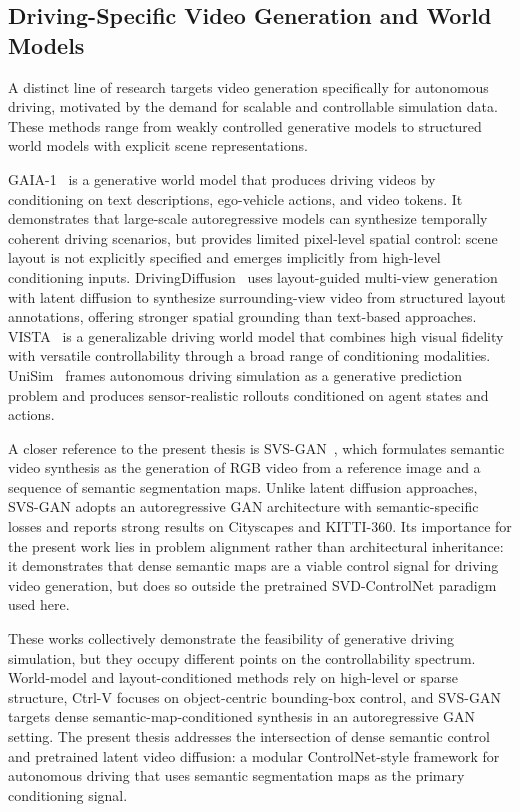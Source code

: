 \FloatBarrier

\subsection{Driving-Specific Video Generation and World Models}
\label{subsec:driving_generation}

A distinct line of research targets video generation specifically for autonomous driving, motivated by the demand for scalable and controllable simulation data. These methods range from weakly controlled generative models to structured world models with explicit scene representations.

GAIA-1~\cite{hu2023gaia} is a generative world model that produces driving videos by conditioning on text descriptions, ego-vehicle actions, and video tokens. It demonstrates that large-scale autoregressive models can synthesize temporally coherent driving scenarios, but provides limited pixel-level spatial control: scene layout is not explicitly specified and emerges implicitly from high-level conditioning inputs. DrivingDiffusion~\cite{li2023drivingdiffusion} uses layout-guided multi-view generation with latent diffusion to synthesize surrounding-view video from structured layout annotations, offering stronger spatial grounding than text-based approaches. VISTA~\cite{gao2024vista} is a generalizable driving world model that combines high visual fidelity with versatile controllability through a broad range of conditioning modalities. UniSim~\cite{yang2024generalized} frames autonomous driving simulation as a generative prediction problem and produces sensor-realistic rollouts conditioned on agent states and actions.

A closer reference to the present thesis is SVS-GAN~\cite{seyam2024svsgan}, which formulates semantic video synthesis as the generation of RGB video from a reference image and a sequence of semantic segmentation maps. Unlike latent diffusion approaches, SVS-GAN adopts an autoregressive GAN architecture with semantic-specific losses and reports strong results on Cityscapes and KITTI-360. Its importance for the present work lies in problem alignment rather than architectural inheritance: it demonstrates that dense semantic maps are a viable control signal for driving video generation, but does so outside the pretrained SVD-ControlNet paradigm used here.

These works collectively demonstrate the feasibility of generative driving simulation, but they occupy different points on the controllability spectrum. World-model and layout-conditioned methods rely on high-level or sparse structure, Ctrl-V focuses on object-centric bounding-box control, and SVS-GAN targets dense semantic-map-conditioned synthesis in an autoregressive GAN setting. The present thesis addresses the intersection of dense semantic control and pretrained latent video diffusion: a modular ControlNet-style framework for autonomous driving that uses semantic segmentation maps as the primary conditioning signal.

